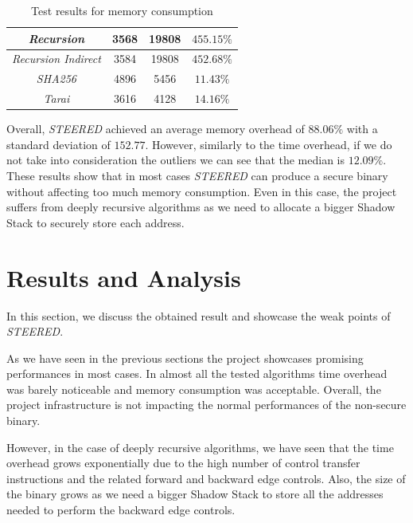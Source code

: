 \begin{table}
\begin{tabular}{|c|c|c|c|}
    \hline
    \textit{Recursion}                   & 3568                         & 19808                        & $455.15\%$               \\
    \hline
    \textit{Recursion Indirect}          & 3584                         & 19808                        & $452.68\%$               \\
    \hline
    \textit{SHA256}                      & 4896                         & 5456                         & $11.43\%$                \\
    \hline
    \textit{Tarai}                       & 3616                         & 4128                         & $14.16\%$                \\
    \hline
  \end{tabular}
  \caption{Test results for memory consumption}
  \label{tab:binsize}
\end{table}

Overall, \textit{STEERED} achieved an average memory overhead of $88.06\%$ with
a standard deviation of $152.77$. However, similarly to the time overhead, if we
do not take into consideration the outliers we can see that the median is $1 2.09
\%$. These results show that in most cases \textit{STEERED} can produce a secure
binary without affecting too much memory consumption. Even in this case, the project
suffers from deeply recursive algorithms as we need to allocate a bigger Shadow Stack
to securely store each address.

\section{Results and Analysis}
\label{sec:pa_results}

In this section, we discuss the obtained result and showcase the weak points of \textit{STEERED}.

As we have seen in the previous sections the project showcases promising
performances in most cases. In almost all the tested algorithms time overhead was
barely noticeable and memory consumption was acceptable. Overall, the project infrastructure
is not impacting the normal performances of the non-secure binary.

However, in the case of deeply recursive algorithms, we have seen that the time overhead
grows exponentially due to the high number of control transfer instructions and the
related forward and backward edge controls. Also, the size of the binary grows as
we need a bigger Shadow Stack to store all the addresses needed to perform the backward
edge controls.

